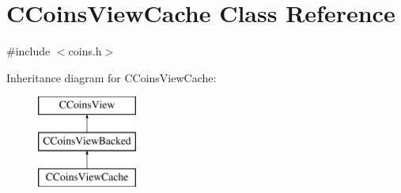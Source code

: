 \hypertarget{class_c_coins_view_cache}{}\section{C\+Coins\+View\+Cache Class Reference}
\label{class_c_coins_view_cache}


{\ttfamily \#include $<$coins.\+h$>$}

Inheritance diagram for C\+Coins\+View\+Cache\+:\begin{figure}[H]
\begin{center}
\leavevmode
\includegraphics[height=3.000000cm]{class_c_coins_view_cache}
\end{center}
\end{figure}
